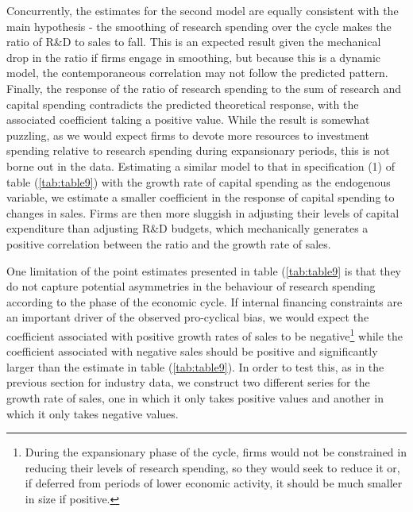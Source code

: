 \documentclass{_latex/house}
\begin{document}
Concurrently, the estimates for the second model are equally consistent with the main hypothesis - the smoothing of research spending over the cycle makes the ratio of R\&D to sales to fall. This is an expected result given the mechanical drop in the ratio if firms engage in smoothing, but because this is a dynamic model, the contemporaneous correlation may not follow the predicted pattern. Finally, the response of the ratio of research spending to the sum of research and capital spending contradicts the predicted theoretical response, with the associated coefficient taking a positive value. While the result is somewhat puzzling, as we would expect firms to devote more resources to investment spending relative to research spending during expansionary periods, this is not borne out in the data. Estimating a similar model to that in specification (1) of table (\ref{tab:table9}) with the growth rate of capital spending as the endogenous variable, we estimate a smaller coefficient in the response of capital spending to changes in sales. Firms are then more sluggish in adjusting their levels of capital expenditure than adjusting R\&D budgets, which mechanically generates a positive correlation between the ratio and the growth rate of sales.

One limitation of the point estimates presented in table (\ref{tab:table9} is that they do not capture potential asymmetries in the behaviour of research spending according to the phase of the economic cycle. If internal financing constraints are an important driver of the observed pro-cyclical bias, we would expect the coefficient associated with positive growth rates of sales to be negative\footnote{During the expansionary phase of the cycle, firms would not be constrained in reducing their levels of research spending, so they would seek to reduce it or, if deferred from periods of lower economic activity, it should be much smaller in size if positive.} while the coefficient associated with negative sales should be positive and significantly larger than the estimate in table (\ref{tab:table9}). In order to test this, as in the previous section for industry data, we construct two different series for the growth rate of sales, one in which it only takes positive values and another in which it only takes negative values.
\end{document}
